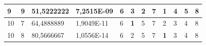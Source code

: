 \documentclass[conference]{IEEEtran}
\begin{document}
\begin{table}[]
\begin{tabular}{|llll|llllllll|}
\multicolumn{1}{|l|}{9}                                                     & \multicolumn{1}{l|}{9}                                                        & \multicolumn{1}{l|}{51,5222222}                                                   & 7,2515E-09                     & \multicolumn{1}{l|}{6}                                                  & \multicolumn{1}{l|}{3}                                                  & \multicolumn{1}{l|}{2}                                                  & \multicolumn{1}{l|}{7}                                                  & \multicolumn{1}{l|}{\textbf{1}}                                         & \multicolumn{1}{l|}{4}                                                  & \multicolumn{1}{l|}{5}                                                  & 8                          \\ \hline
\multicolumn{1}{|l|}{10}                                                    & \multicolumn{1}{l|}{7}                                                        & \multicolumn{1}{l|}{64,4888889}                                                   & 1,9049E-11                     & \multicolumn{1}{l|}{6}                                                  & \multicolumn{1}{l|}{\textbf{1}}                                         & \multicolumn{1}{l|}{5}                                                  & \multicolumn{1}{l|}{7}                                                  & \multicolumn{1}{l|}{2}                                                  & \multicolumn{1}{l|}{3}                                                  & \multicolumn{1}{l|}{4}                                                  & 8                          \\ \hline
\multicolumn{1}{|l|}{10}                                                    & \multicolumn{1}{l|}{8}                                                        & \multicolumn{1}{l|}{80,5666667}                                                   & 1,0556E-14                     & \multicolumn{1}{l|}{6}                                                  & \multicolumn{1}{l|}{2}                                                  & \multicolumn{1}{l|}{5}                                                  & \multicolumn{1}{l|}{7}                                                  & \multicolumn{1}{l|}{\textbf{1}}                                         & \multicolumn{1}{l|}{3}                                                  & \multicolumn{1}{l|}{4}                                                  & 8                          \\ \hline

\end{tabular}
\end{table}
\end{document}
